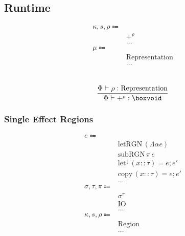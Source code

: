 \documentclass {article}
\begin{document}
\subsection{Runtime}

\begin{align*}
\kappa, s, \rho \Coloneqq & \\
& +^\rho \tag{Pretype Kind}\\
& \dots \\
\mu \Coloneqq & \\
& \text{Representation} \\
& \dots
\end{align*}

\begin{gather*}
\\
\frac
{\Phi \vdash \rho : \text{Representation}}
{\Phi \vdash +^\rho : \boxvoid} \\
\end{gather*}

\subsubsection{Single Effect Regions}
\begin{align*}
e \Coloneqq & \\
& \text{letRGN} \, (\Lambda \alpha e) \tag{Create Region} \\
& \text{subRGN} \, \pi \, e \tag{Subtype Region} \\
& \text{let}^\downarrow \, (x :: \tau) = e; e' \tag{Runtime Let} \\
& \text{copy} \, (x :: \tau) = e; e' \tag{Runtime Copy Let} \\
& \dots \\
\sigma, \tau, \pi \Coloneqq & \\
& \sigma^\pi \tag{Region Effect} \\
& \text{IO} \tag{IO Region} \\
& \dots \\
\kappa, s, \rho \Coloneqq & \\
& \text{Region} \tag{Region} \\
& \dots
\end{align*}
\end{document}
